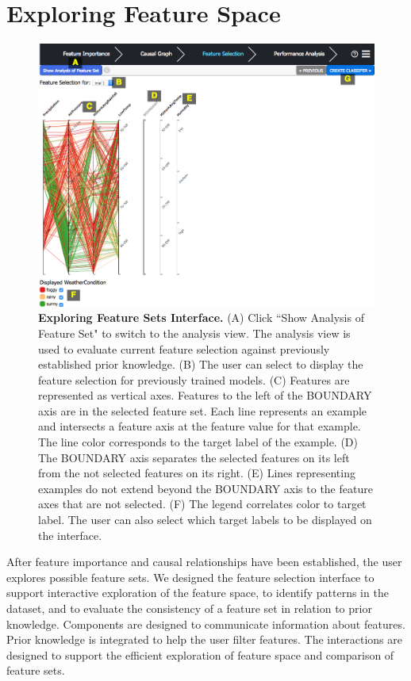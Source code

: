 \section{Exploring Feature Space}
\begin{figure}[!htbp]
\centering
\includegraphics[width=1\textwidth]{LabeledFSInterface}
\caption{\textbf{Exploring Feature Sets Interface.} (A) Click ``Show Analysis of Feature Set" to switch to the analysis view. The analysis view is used to evaluate current feature selection against previously established prior knowledge. (B) The user can select to display the feature selection for previously trained models. (C) Features are represented as vertical axes. Features to the left of the BOUNDARY axis are in the selected feature set. Each line represents an example and intersects a feature axis at the feature value for that example. The line color corresponds to the target label of the example. (D) The BOUNDARY axis separates the selected features on its left from the not selected features on its right. (E) Lines representing examples do not extend beyond the BOUNDARY axis to the feature axes that are not selected. (F) The legend correlates color to target label. The user can also select which target labels to be displayed on the interface. } \label{fig:LabelFSInterface}
\end{figure}

After feature importance and causal relationships have been established, the user explores possible feature sets. We designed the feature selection interface to support interactive exploration of the feature space, to identify patterns in the dataset, and to evaluate the consistency of a feature set in relation to prior knowledge. Components are designed to communicate information about features. Prior knowledge is integrated to help the user filter features. The interactions are designed to support the efficient exploration of feature space and comparison of feature sets. 

